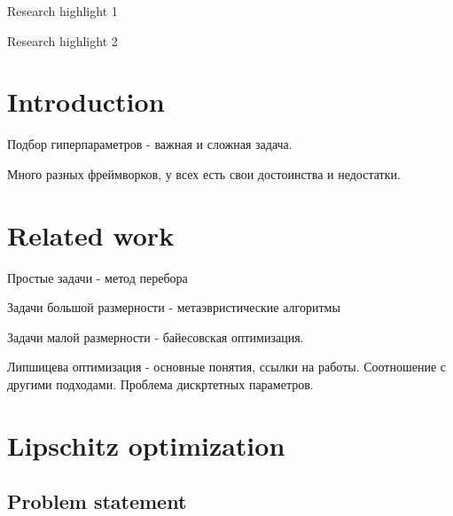 \documentclass[preprint,12pt]{elsarticle}
\begin{document}
\begin{frontmatter}

\begin{highlights}
\item Research highlight 1
\item Research highlight 2
\end{highlights}

\begin{keyword}



\end{keyword}

\end{frontmatter}

\linenumbers

\section{Introduction}
\label{sec_intro}
Подбор гиперпараметров - важная и сложная задача.

Много разных фреймворков, у всех есть свои достоинства и недостатки.


\section{Related work}
\label{sec_rel}

Простые задачи - метод перебора

Задачи большой размерности - метаэвристические алгоритмы

Задачи малой размерности - байесовская оптимизация.

Липшицева оптимизация - основные понятия, ссылки на работы. Соотношение с другими подходами. Проблема дискртетных параметров. 



\section{Lipschitz optimization} 
\label{sec_lip}

\subsection{Problem statement} 
\end{document}

